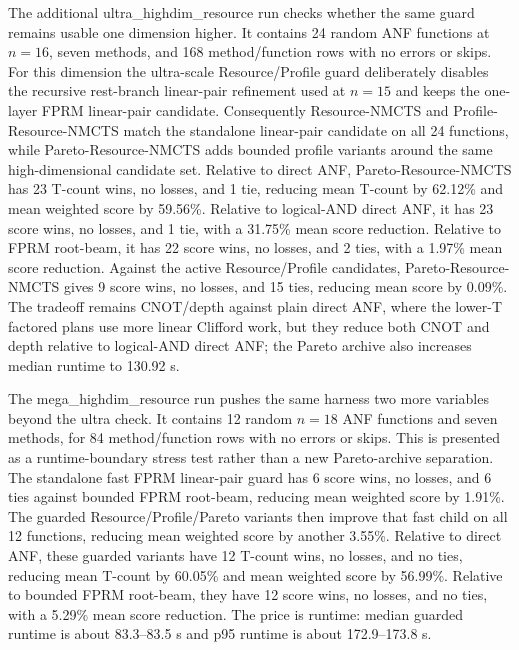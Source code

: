 \documentclass[11pt]{article}
\newcommand{\method}{Resource-NMCTS}
\newcommand{\profilemethod}{Profile-Resource-NMCTS}
\newcommand{\paretomethod}{Pareto-Resource-NMCTS}
\newcommand{\ultradataset}{ultra\_highdim\_resource}
\newcommand{\megadataset}{mega\_highdim\_resource}
\begin{document}
The additional \ultradataset{} run checks whether the same guard remains usable
one dimension higher.  It contains 24 random ANF functions at $n=16$, seven
methods, and 168 method/function rows with no errors or skips.  For this
dimension the ultra-scale Resource/Profile guard deliberately disables the
recursive rest-branch linear-pair refinement used at $n=15$ and keeps the
one-layer FPRM linear-pair candidate.  Consequently \method{} and
\profilemethod{} match the standalone linear-pair candidate on all 24
functions, while \paretomethod{} adds bounded profile variants around the same
high-dimensional candidate set.  Relative to direct ANF, \paretomethod{} has
23 T-count wins, no losses, and 1 tie, reducing mean T-count by 62.12\% and
mean weighted score by 59.56\%.  Relative to logical-AND direct ANF, it has
23 score wins, no losses, and 1 tie, with a 31.75\% mean score reduction.
Relative to FPRM root-beam, it has 22 score wins, no losses, and 2 ties, with
a 1.97\% mean score reduction.  Against the active Resource/Profile candidates,
\paretomethod{} gives 9 score wins, no losses, and 15 ties, reducing mean score
by 0.09\%.  The tradeoff remains CNOT/depth against plain direct ANF, where the
lower-T factored plans use more linear Clifford work, but they reduce both CNOT
and depth relative to logical-AND direct ANF; the Pareto archive also increases
median runtime to 130.92 s.

\begin{table}[t]
\centering
\small
\caption{Mean logical resources on the \ultradataset{} $n=16$ scale check.}
\label{tab:ultra-resources}

\end{table}

\begin{table}[t]
\centering
\small
\caption{Runtime distribution on the \ultradataset{} $n=16$ scale check.}
\label{tab:ultra-runtime}

\end{table}

The \megadataset{} run pushes the same harness two more variables beyond the
ultra check.  It contains 12 random $n=18$ ANF functions and seven methods,
for 84 method/function rows with no errors or skips.  This is presented as a
runtime-boundary stress test rather than a new Pareto-archive separation.  The
standalone fast FPRM linear-pair guard has 6 score wins, no losses, and 6 ties
against bounded FPRM root-beam, reducing mean weighted score by 1.91\%.  The
guarded Resource/Profile/Pareto variants then improve that fast child on all
12 functions, reducing mean weighted score by another 3.55\%.  Relative to
direct ANF, these guarded variants have 12 T-count wins, no losses, and no
ties, reducing mean T-count by 60.05\% and mean weighted score by 56.99\%.
Relative to bounded FPRM root-beam, they have 12 score wins, no losses, and no
ties, with a 5.29\% mean score reduction.  The price is runtime: median
guarded runtime is about 83.3--83.5 s and p95 runtime is about 172.9--173.8 s.
\end{document}
